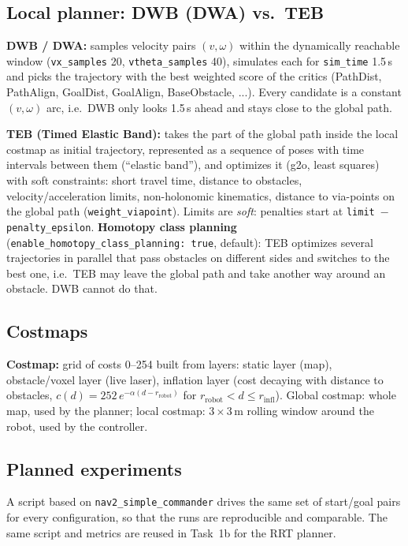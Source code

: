 \documentclass[10pt]{article}
\newcommand{\pkg}[1]{\texttt{#1}}
\begin{document}
\subsection{Local planner: DWB (DWA) vs.\ TEB}
\textbf{DWB / DWA:} samples velocity pairs $(v,\omega)$ within the dynamically reachable window
(\pkg{vx\_samples} 20, \pkg{vtheta\_samples} 40), simulates each for \pkg{sim\_time} 1.5\,s and picks the
trajectory with the best weighted score of the critics (PathDist, PathAlign, GoalDist, GoalAlign, BaseObstacle, ...).
Every candidate is a constant $(v,\omega)$ arc, i.e.\ DWB only looks 1.5\,s ahead and stays close to the global path.

\textbf{TEB (Timed Elastic Band):} takes the part of the global path inside the local costmap as initial trajectory,
represented as a sequence of poses with time intervals between them (``elastic band''), and optimizes it
(g2o, least squares) with soft constraints: short travel time, distance to obstacles, velocity/acceleration limits,
non-holonomic kinematics, distance to via-points on the global path (\pkg{weight\_viapoint}). Limits are
\emph{soft}: penalties start at \pkg{limit $-$ penalty\_epsilon}. \textbf{Homotopy class planning}
(\pkg{enable\_homotopy\_class\_planning: true}, default): TEB optimizes several trajectories in parallel that pass
obstacles on different sides and switches to the best one, i.e.\ TEB may leave the global path and take
another way around an obstacle. DWB cannot do that.

\subsection{Costmaps}
\textbf{Costmap:} grid of costs 0--254 built from layers: static layer (map), obstacle/voxel layer (live laser),
inflation layer (cost decaying with distance to obstacles, $c(d) = 252\,e^{-\alpha(d - r_\text{robot})}$ for
$r_\text{robot} < d \le r_\text{infl}$). Global costmap: whole map, used by the planner; local costmap:
$3\times3$\,m rolling window around the robot, used by the controller.

\subsection{Planned experiments}
A script based on \pkg{nav2\_simple\_commander} drives the same set of start/goal pairs
for every configuration, so that the runs are reproducible and comparable. The same
script and metrics are reused in Task~1b for the RRT planner.
\end{document}
